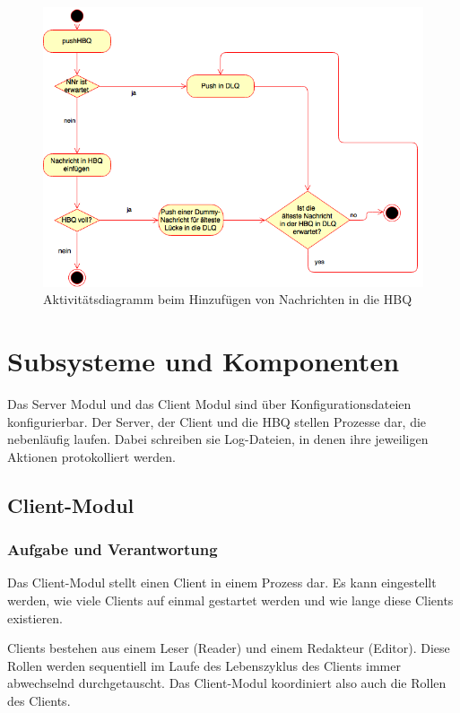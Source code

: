 \documentclass{article}
\begin{document}
\begin{figure}[H]
\centering
\includegraphics[width=\textwidth]{FullHBQSequence.png}
\caption[act-dia]{Aktivitätsdiagramm beim Hinzufügen von Nachrichten in die HBQ}
\label{fig:acivity-diagram}
\end{figure}

\newpage

\section{Subsysteme und Komponenten}
Das Server Modul und das Client Modul sind über Konfigurationsdateien konfigurierbar. Der Server, der Client und die HBQ
stellen Prozesse dar, die nebenläufig laufen. Dabei schreiben sie Log-Dateien, in denen ihre jeweiligen Aktionen
protokolliert werden.

\subsection{Client-Modul}
\subsubsection{Aufgabe und Verantwortung}
Das Client-Modul stellt einen Client in einem Prozess dar. Es kann eingestellt werden, wie viele Clients auf einmal
gestartet werden und wie lange diese Clients existieren.

Clients bestehen aus einem Leser (Reader) und einem Redakteur (Editor). Diese Rollen werden sequentiell im Laufe des
Lebenszyklus des Clients immer abwechselnd durchgetauscht. Das Client-Modul koordiniert also auch die Rollen des
Clients.
\end{document}
